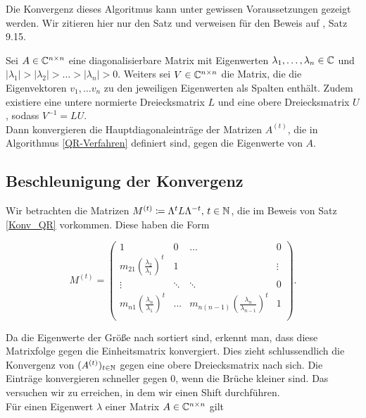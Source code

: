 \documentclass{article}
\begin{document}
Die Konvergenz dieses Algoritmus kann unter gewissen Voraussetzungen gezeigt werden. Wir zitieren hier nur den Satz und verweisen für den Beweis auf \cite{Num}, Satz 9.15.

\begin{theorem}
	\label{Konv_QR}
	Sei $A \in \mathbb{C}^{n\times n}$ eine diagonalisierbare Matrix mit Eigenwerten $\lambda_1,\dots,\lambda_n \in \mathbb{C}$ und $|\lambda_1| > |\lambda_2| > \dots > |\lambda_n| > 0$. Weiters sei $V \in \mathbb{C}^{n \times n}$ die Matrix, die die Eigenvektoren $v_1,\dots v_n$ zu den jeweiligen Eigenwerten als Spalten enthält. Zudem existiere eine untere normierte Dreiecksmatrix $L$ und eine obere Dreiecksmatrix $U$, sodass $V^{-1} = LU$.\\
	Dann konvergieren die Hauptdiagonaleinträge der Matrizen $A^{(t)}$, die in Algorithmus \ref{QR-Verfahren} definiert sind, gegen die Eigenwerte von $A$.
\end{theorem}


\subsection{Beschleunigung der Konvergenz}

Wir betrachten die Matrizen $M^{(t)} \coloneqq \Lambda^t L \Lambda^{-t},\, t \in \mathbb{N}$, die im Beweis von Satz \ref{Konv_QR} vorkommen. Diese haben die Form

\begin{equation*}
	M^{(t)} =
	\left( \begin{array}{cccc}
		1 & 0 & \dots & 0 \\
		m_{21} \left(\frac{\lambda_2}{\lambda_1}\right)^t & 1 &  &\vdots \\
		\vdots & \ddots & \ddots & 0 \\
		m_{n1} \left(\frac{\lambda_n}{\lambda_1}\right)^t & \dots & m_{n(n-1)} \left(\frac{\lambda_n}{\lambda_{n-1}}\right)^t & 1 \\
	\end{array}\right).
\end{equation*}

\vspace{4pt}
Da die Eigenwerte der Größe nach sortiert sind, erkennt man, dass diese Matrixfolge gegen die Einheitsmatrix konvergiert. Dies zieht schlussendlich die Konvergenz von $(A^{(t)})_{t\in \mathbb{N}}$ gegen eine obere Dreiecksmatrix nach sich.
Die Einträge konvergieren schneller gegen $0$, wenn die Brüche kleiner sind. Das versuchen wir zu erreichen, in dem wir einen Shift durchführen.\\
Für einen Eigenwert $\lambda$ einer Matrix $A \in \mathbb{C}^{n\times n}$ gilt
\end{document}
